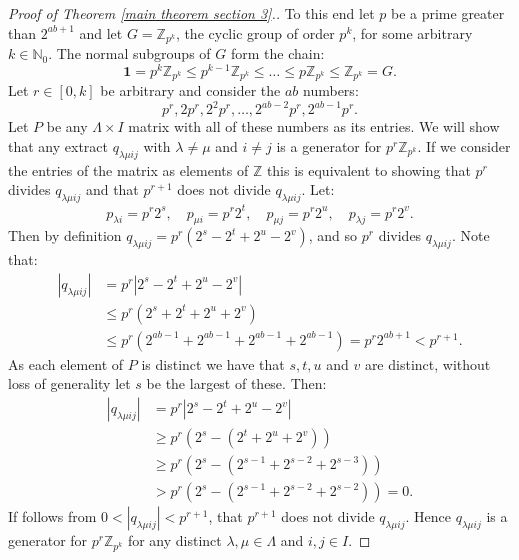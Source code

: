 \documentclass[10pt,a4paper]{amsart}
\newcommand{\N}{\mathbb{N}}
\newcommand{\Z}{\mathbb{Z}}
\begin{document}
\begin{proof}[Proof of Theorem \ref{main theorem section 3}.]
    To this end let $p$ be a prime greater than $2^{ab+1} $ and let $G = \Z_{p^k}$, the cyclic group of order $p^k$, for some arbitrary $k \in \N_0$.
    The normal subgroups of $G$ form the chain:
    \begin{equation*}
    \textbf{1} = p^k \Z_{p^k} \leq p^{k-1} \Z_{p^k} \leq \dots \leq p \Z_{p^k} \leq \Z_{p^k} = G.
    \end{equation*}
    Let $r \in [0,k]$ be arbitrary and consider the $ab$ numbers:
    \begin{equation*}
        p^r,2p^r, 2^2 p^r, \dots,2^{ab-2} p^r , 2^{ab-1} p^r.
    \end{equation*}
    Let $P$ be any $\Lambda \times I$ matrix with all of these numbers as its entries.
    We will show that any extract $q_{\lambda \mu i j}$ with $\lambda \neq \mu$ and $i \neq j$ is a generator for $p^r \Z_{p^k}$. 
    If we consider the entries of the matrix as elements of $\Z$ this is equivalent to showing that $p^r$ divides $q_{\lambda \mu i j}$ and that $p^{r+1}$ does not divide $q_{\lambda \mu i j }$. Let:
    \begin{equation*}
        p_{\lambda i} = p^r 2^s, \quad p_{\mu i} = p^r 2^t, \quad p_{\mu j} = p^r 2^u, \quad p_{\lambda j } = p^r 2^v.
    \end{equation*}
    Then by definition $q_{\lambda \mu i j} = p^r(2^s - 2^t + 2^u - 2^v)$, and so $p^r$ divides $q_{\lambda \mu i j}$. 
    Note that:
    \begin{align*}
        | q_{\lambda \mu i j}| & = p^r| 2^s - 2^t +2^u -2^v| \\
        & \leq  p^r( 2^s + 2^t +2^u +2^v) \\
        & \leq p^r(2^{ab - 1} + 2^{ab - 1} + 2^{ab - 1} + 2^{ab - 1}) = p^r2^{ab+1} < p^{r+1}.
    \end{align*}
    As each element of $P$ is distinct we have that $s,t,u$ and $v$ are distinct, without loss of generality let $s$ be the largest of these.
    Then:
    \begin{align*}
        | q_{\lambda \mu i j}| & = p^r|2^s - 2^t + 2^u -2^v|\\
        & \geq p^r(2^s - (2^t +2^u + 2^v)) \\
        & \geq p^r(2^s - (2^{s-1} + 2^{s-2} + 2^{s-3})) \\
        & > p^r(2^s - (2^{s-1} + 2^{s-2} + 2^{s-2})) = 0.
    \end{align*}
    If follows from $0 < |q_{\lambda \mu i j}| < p^{r+1}$, that $p^{r+1}$ does not divide $q_{\lambda \mu i j}$.
    Hence $q_{\lambda \mu i j}$ is a generator for $p^r\Z_{p^k}$ for any distinct $\lambda ,\mu \in \Lambda$ and $i,j \in I$.
    

\end{proof}
\end{document}
